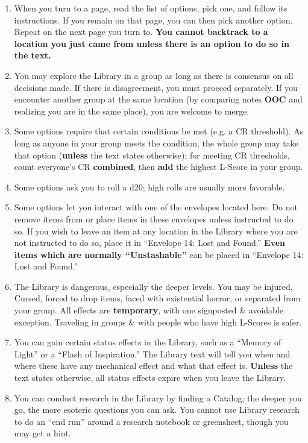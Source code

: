 \documentclass[sheet]{GL2020}
\begin{document}
\begin{enumerate}
	\item When you turn to a page, read the list of options, pick one, and follow its instructions. If you remain on that page, you can then pick another option. Repeat on the next page you turn to. \textbf{You cannot backtrack to a location you just came from unless there is an option to do so in the text.}
	\item You may explore the Library in a group as long as there is consensus on all decisions made. If there is disagreement, you must proceed separately. If you encounter another group at the same location (by comparing notes \textbf{OOC} and realizing you are in the same place), you are welcome to merge.
	\item Some options require that certain conditions be met (e.g. a CR threshold). As long as anyone in your group meets the condition, the whole group may take that option (\textbf{unless} the text states otherwise); for meeting CR thresholds, count everyone’s CR \textbf{combined}, then \textbf{add} the highest L-Score in your group. 
	\item Some options ask you to roll a d20; high rolls are usually more favorable. 
	\item Some options let you interact with one of the envelopes located here. Do not remove items from or place items in these envelopes unless instructed to do so. If you wish to leave an item at any location in the Library where you are not instructed to do so, place it in “Envelope 14: Lost and Found.” \textbf{Even items which are normally “Unstashable”} can be placed in “Envelope 14: Lost and Found.”
	\item The Library is dangerous, especially the deeper levels. You may be injured, Cursed, forced to drop items, faced with existential horror, or separated from your group. All effects are \textbf{temporary}, with one signposted \& avoidable exception. Traveling in groups \& with people who have high L-Scores is safer.
	\item You can gain certain status effects in the Library, such as a “Memory of Light” or a “Flash of Inspiration.” The Library text will tell you when and where these have any mechanical effect and what that effect is. \textbf{Unless} the text states otherwise, all status effects expire when you leave the Library.
	\item You can conduct research in the Library by finding a Catalog; the deeper you go, the more esoteric questions you can ask. You cannot use Library research to do an “end run” around a research notebook or greensheet, though you may get a hint.

\end{enumerate}
\end{document}
